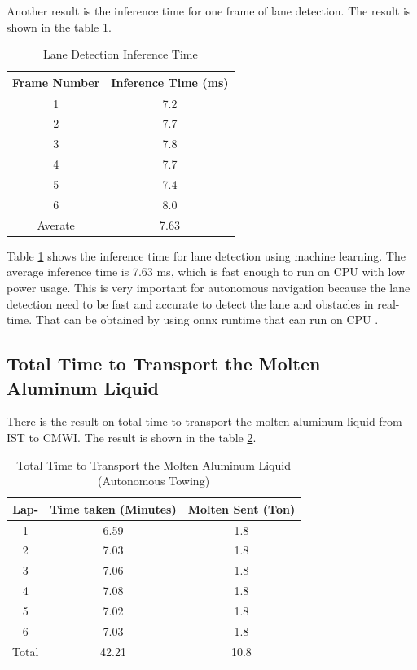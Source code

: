 \documentclass[conference]{IEEEtran}
\begin{document}
\par   
Another result is the inference time for one frame of lane detection. The result is shown in the table \ref{tab:lane_detection_inference_time}. 
\begin{table}[H]
	\centering
	\caption{Lane Detection Inference Time}
	\label{tab:lane_detection_inference_time}
	\begin{tabular}{|c|c|}
		\hline
		\textbf{Frame Number} & \textbf{Inference Time (ms)} \\ \hline
		1 & 7.2 \\ \hline
		2 & 7.7 \\ \hline
		3 & 7.8 \\ \hline
		4 & 7.7 \\ \hline
		5 & 7.4 \\ \hline
		6 & 8.0 \\ \hline
		Averate & 7.63 \\ \hline
	\end{tabular}
\end{table}
Table \ref{tab:lane_detection_inference_time} shows the inference time for lane detection using machine learning. The average inference time is 7.63 ms, which is fast enough to run on CPU with low power usage. This is very important for autonomous navigation because the lane detection need to be fast and accurate to detect the lane and obstacles in real-time. That can be obtained by using onnx runtime that can run on CPU \cite{ref_onnx}. 

\subsection{Total Time to Transport the Molten Aluminum Liquid}
There is the result on total time to transport the molten aluminum liquid from IST to CMWI. The result is shown in the table \ref{tab:total_time_transport}.
\begin{table}[H]
	\centering
	\caption{Total Time to Transport the Molten Aluminum Liquid (Autonomous Towing)}
	\label{tab:total_time_transport}
	\begin{tabular}{|c|c|c|}
		\hline
		\textbf{Lap-} & \textbf{Time taken (Minutes)} & \textbf{Molten Sent (Ton)} \\ \hline
		1 & 6.59 & 1.8 \\ \hline
		2 & 7.03 & 1.8 \\ \hline
		3 & 7.06 & 1.8 \\ \hline
		4 & 7.08 & 1.8 \\ \hline
		5 & 7.02 & 1.8 \\ \hline
		6 & 7.03 & 1.8 \\ \hline
		Total & 42.21 & 10.8 \\ \hline
	\end{tabular}
\end{table} 
\end{document}
